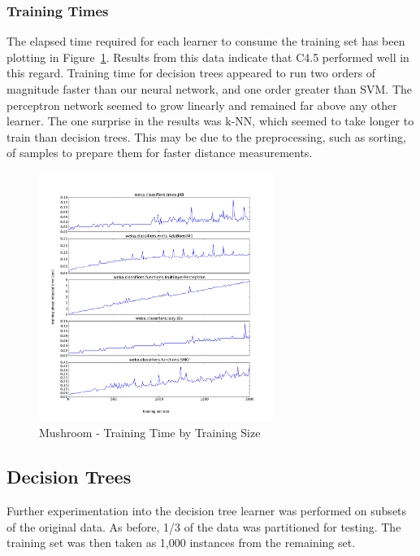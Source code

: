 \documentclass{sig-alternate}
\begin{document}
\subsubsection{Training Times}

The elapsed time required for each learner to consume the training set has been plotting in Figure~\ref{ag-runtime}. Results from this data indicate that C4.5 performed well in this regard. Training time for decision trees appeared to run two orders of magnitude faster than our neural network, and one order greater than SVM. The perceptron network seemed to grow linearly and remained far above any other learner. The one surprise in the results was k-NN, which seemed to take longer to train than decision trees. This may be due to the preprocessing, such as sorting, of samples to prepare them for faster distance measurements.


\begin{figure}[!htbp]
    \centering
    \includegraphics[width=3in]{data/agaricus-lepiota/learning-curve-10to2000/runtime.pdf}
    \caption{Mushroom - Training Time by Training Size \label{ag-runtime}}
\end{figure} 


\subsection{Decision Trees}

Further experimentation into the decision tree learner was performed on subsets of the original data. As before, 1/3 of the data was partitioned for testing. The training set was then taken as 1,000 instances from the remaining set.
\end{document}
